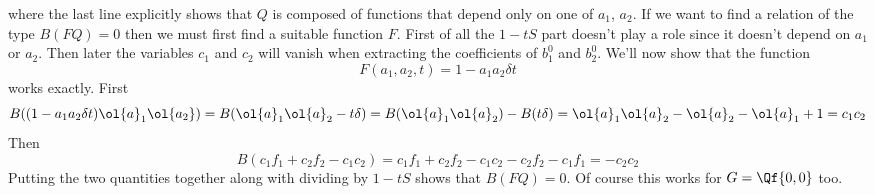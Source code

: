 where the last line explicitly shows that $Q$ is composed of functions that depend only on one of $a_1$, $a_2$. If we want to find a relation of the type $B(FQ) = 0$ then we must first find a suitable function $F$. First of all the $1-tS$ part doesn't play a role since it doesn't depend on $a_1$ or $a_2$. Then later the variables $c_1$ and $c_2$ will vanish when extracting the coefficients of $b_1^0$ and $b_2^0$. We'll now show that the function
\[
	F(a_1,a_2,t) = 1 - a_1 a_2 \delta t
\]
works exactly. First
\[
B((1 - a_1 a_2 \delta t)\ol{a}_1\ol{a_2}) = B(\ol{a}_1\ol{a}_2 - t \delta) = B(\ol{a}_1\ol{a}_2) - B(t \delta) = \ol{a}_1\ol{a}_2- \ol{a}_2-\ol{a}_1 + 1 = c_1 c_2
\]
Then
\[
	B(c_1 f_1+ c_2 f_2-c_1c_2) = c_1 f_1 + c_2 f_2 -c_1c_2 - c_2 f_2 - c_1 f_1 = -c_2 c_2
\]
Putting the two quantities together along with dividing by $1-tS$ shows that $B(FQ) = 0$. Of course this works for $G = \Qf{0,0}$ too.

